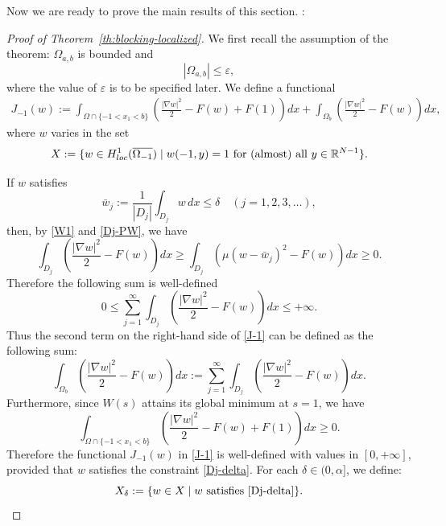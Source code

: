 \documentclass[a4paper,12pt,fullpage]{article}
\numberwithin{equation}{section}
\def\R{{\mathbb R}}
\def\ep{\varepsilon}
\begin{document}
Now we are ready to prove the main results of this section.
\vskip 8pt
\noindent
{}:

\vskip 6pt 
\begin{proof}[Proof of Theorem~\ref{th:blocking-localized}]
We first recall the assumption of the theorem: $\Omega_{a,b}$ is bounded and
\begin{equation}\label{ab-epsilon}
|\Omega_{a,b}| \leq \ep,
\end{equation}
where the value of $\ep$ is to be specified later. We define a functional 
\begin{equation}\label{J-1}
\begin{split}
J_{-1}(w):=\int_{\Omega\cap\{-1<x_1<b\}}\left( \frac{|\nabla w|^2}{2}-F(w)+F(1)\right)dx+\int_{\Omega_b }\left( \frac{|\nabla w|^2}{2}-F(w)\right)dx,
\end{split}
\end{equation}
where $w$ varies in the set
\begin{equation*}%
X:=\{w\in H^1_{loc}(\overline{\Omega_{-1}})\mid w(-1,y)=1 \ \hbox{for (almost) all}\ y\in\R^{N-1}\}.
\end{equation*}

If $w$ satisfies
\begin{equation}\label{Dj-delta}
\bar{w}_j:=\frac{1}{|D_j|} \int_{D_j} w\hspace{2pt} dx \leq \delta \quad(j=1,2,3,\ldots),
\end{equation}
then, by \eqref{W1} and \eqref{Dj-PW}, we have
\begin{equation}\label{Dj-J-w}
\int_{D_j}\left( \frac{|\nabla w|^2}{2}-F(w)\right)dx\geq  \int_{D_j}\left(\mu (w-\bar{w}_j)^2-F(w)\right)dx \geq 0.
\end{equation}
Therefore the following sum is well-defined
\[
0\leq \sum_{j=1}^\infty \int_{D_j}\left( \frac{|\nabla w|^2}{2}-F(w)\right)dx \leq+\infty.
\]
Thus the second term on the right-hand side of \eqref{J-1} can be defined as the following sum:
\[
\int_{\Omega_b }\left( \frac{|\nabla w|^2}{2}-F(w)\right)dx:=
\sum_{j=1}^\infty \int_{D_j}\left( \frac{|\nabla w|^2}{2}-F(w)\right)dx.
\]
Furthermore, since $W(s)$ attains its global minimum at $s=1$, we have
\begin{equation}\label{J-1-w}
\int_{\Omega\cap\{-1<x_1<b\}}\left( \frac{|\nabla w|^2}{2}-F(w)+F(1)\right)dx\geq 0.
\end{equation}
Therefore the functional $J_{-1}(w)$ in \eqref{J-1} is well-defined with values in $[0,+\infty]$, provided that $w$ satisfies the constraint \eqref{Dj-delta}. For each $\delta\in(0,\alpha]$, we define:
\begin{equation}\label{X-delta} 
X_\delta:=\{w\in X\mid \hbox{$w$ satisfies \eqref{Dj-delta}} \}.
\end{equation}


\end{proof}
\end{document}
